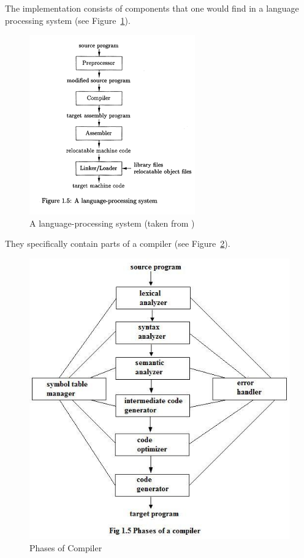 \documentclass[thesis-solanki.tex]{subfiles}
\begin{document}
The implementation consists of components that one would find in a language processing system (see
Figure~\ref{fig:A language-processing system}).



\begin{figure}[H]
\centering
\includegraphics[scale = .95]{Language_Processing_System.png}
\caption{A language-processing system (taken from \cite{Aho:1986:CPT:6448})}
\label{fig:A language-processing system}
\end{figure}

They specifically contain parts of a compiler (see Figure~\ref{fig:Phases of Compiler}).

\begin{figure}[H]
\centering
\includegraphics[scale = 0.7]{Phases_of_compiler.jpg}
\caption{Phases of Compiler \cite{Aho:1986:CPT:6448}}
\label{fig:Phases of Compiler}
\end{figure}
\end{document}
